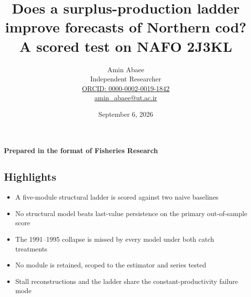 \documentclass[11pt]{article}
\providecommand{\tightlist}{\setlength{\itemsep}{0pt}\setlength{\parskip}{0pt}}
\begin{document}
\title{Does a surplus-production ladder improve forecasts of Northern cod? A scored test on NAFO 2J3KL}
\author{Amin Abaee\\[0.35em]
{\small Independent Researcher}\\[0.55em]
{\small\href{https://orcid.org/0000-0002-0019-1842}{ORCID: 0000-0002-0019-1842}}\\[0.3em]
{\small\href{mailto:amin\_abaee@ut.ac.ir}{amin\_abaee@ut.ac.ir}}}
\date{September 6, 2026}
\maketitle

{\centering\small \textbf{Prepared in the format of Fisheries Research}\par}

\subsection{Highlights}\label{highlights}

\begin{itemize}
\tightlist
\item
  A five-module structural ladder is scored against two naive baselines
\item
  No structural model beats last-value persistence on the primary
  out-of-sample score
\item
  The 1991--1995 collapse is missed by every model under both catch
  treatments
\item
  No module is retained, scoped to the estimator and series tested
\item
  Stall reconstructions and the ladder share the constant-productivity
  failure mode
\end{itemize}
\end{document}

